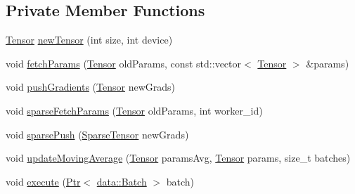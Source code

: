 \subsection*{Private Member Functions}
\begin{DoxyCompactItemize}
\item 
\hyperlink{namespacemarian_a88b71ec34bb354564cddc24eb80f7e14}{Tensor} \hyperlink{classmarian_1_1AsyncGraphGroup_a27115f020b674e27202748d6ab513144}{new\+Tensor} (int size, int device)
\item 
void \hyperlink{classmarian_1_1AsyncGraphGroup_aeec1695ae7d7ac0f819242ad0c8af55d}{fetch\+Params} (\hyperlink{namespacemarian_a88b71ec34bb354564cddc24eb80f7e14}{Tensor} old\+Params, const std\+::vector$<$ \hyperlink{namespacemarian_a88b71ec34bb354564cddc24eb80f7e14}{Tensor} $>$ \&params)
\item 
void \hyperlink{classmarian_1_1AsyncGraphGroup_ae25b4b064f6c327fd957db0583ea7796}{push\+Gradients} (\hyperlink{namespacemarian_a88b71ec34bb354564cddc24eb80f7e14}{Tensor} new\+Grads)
\item 
void \hyperlink{classmarian_1_1AsyncGraphGroup_af104a4373fad7cc8f274423107c58d17}{sparse\+Fetch\+Params} (\hyperlink{namespacemarian_a88b71ec34bb354564cddc24eb80f7e14}{Tensor} old\+Params, int worker\+\_\+id)
\item 
void \hyperlink{classmarian_1_1AsyncGraphGroup_a043878c3c7c2873ae802b5914b3cd73d}{sparse\+Push} (\hyperlink{namespacemarian_a5484064f1fce2661d0b27a5c02a9392b}{Sparse\+Tensor} new\+Grads)
\item 
void \hyperlink{classmarian_1_1AsyncGraphGroup_abce2624a961b51f5502efd78c8f3fc82}{update\+Moving\+Average} (\hyperlink{namespacemarian_a88b71ec34bb354564cddc24eb80f7e14}{Tensor} params\+Avg, \hyperlink{namespacemarian_a88b71ec34bb354564cddc24eb80f7e14}{Tensor} params, size\+\_\+t batches)
\item 
void \hyperlink{classmarian_1_1AsyncGraphGroup_a84479793dfa70a6a4ee0de1e910e8104}{execute} (\hyperlink{namespacemarian_ad1a373be43a00ef9ce35666145137b08}{Ptr}$<$ \hyperlink{classmarian_1_1data_1_1Batch}{data\+::\+Batch} $>$ batch)
\end{DoxyCompactItemize}

